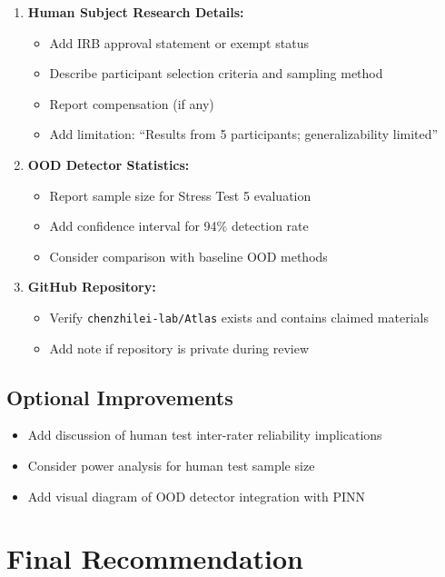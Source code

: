 \documentclass[12pt,a4paper]{article}
\begin{document}
\begin{enumerate}
\item \textbf{Human Subject Research Details:}
\begin{itemize}
\item Add IRB approval statement or exempt status
\item Describe participant selection criteria and sampling method
\item Report compensation (if any)
\item Add limitation: ``Results from 5 participants; generalizability limited''
\end{itemize}

\item \textbf{OOD Detector Statistics:}
\begin{itemize}
\item Report sample size for Stress Test 5 evaluation
\item Add confidence interval for 94\% detection rate
\item Consider comparison with baseline OOD methods
\end{itemize}

\item \textbf{GitHub Repository:}
\begin{itemize}
\item Verify \texttt{chenzhilei-lab/Atlas} exists and contains claimed materials
\item Add note if repository is private during review
\end{itemize}
\end{enumerate}

\subsection{Optional Improvements}

\begin{itemize}
\item Add discussion of human test inter-rater reliability implications
\item Consider power analysis for human test sample size
\item Add visual diagram of OOD detector integration with PINN
\end{itemize}

\section{Final Recommendation}
\end{document}
